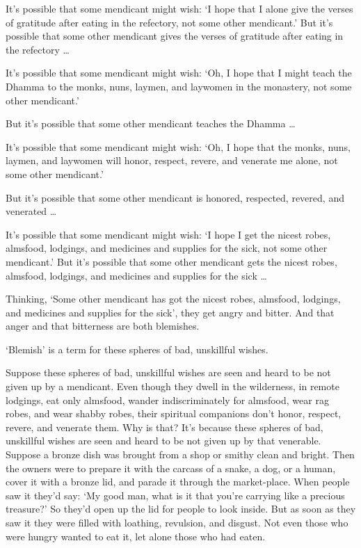 \documentclass[12pt,openany]{book}%
\begin{document}
It’s possible that some mendicant might wish: ‘I hope that I alone give the verses of gratitude after eating in the refectory, not some other mendicant.’ But it’s possible that some other mendicant gives the verses of gratitude after eating in the refectory … 

It’s possible that some mendicant might wish: ‘Oh, I hope that I might teach the Dhamma to the monks, nuns, laymen, and laywomen in the monastery, not some other mendicant.’ 

But it’s possible that some other mendicant teaches the Dhamma … 

It’s possible that some mendicant might wish: ‘Oh, I hope that the monks, nuns, laymen, and laywomen will honor, respect, revere, and venerate me alone, not some other mendicant.’ 

But it’s possible that some other mendicant is honored, respected, revered, and venerated … 

It’s possible that some mendicant might wish: ‘I hope I get the nicest robes, almsfood, lodgings, and medicines and supplies for the sick, not some other mendicant.’ But it’s possible that some other mendicant gets the nicest robes, almsfood, lodgings, and medicines and supplies for the sick … 

Thinking, ‘Some other mendicant has got the nicest robes, almsfood, lodgings, and medicines and supplies for the sick’, they get angry and bitter. And that anger and that bitterness are both blemishes. 

‘Blemish’ is a term for these spheres of bad, unskillful wishes. 

Suppose these spheres of bad, unskillful wishes are seen and heard to be not given up by a mendicant. Even though they dwell in the wilderness, in remote lodgings, eat only almsfood, wander indiscriminately for almsfood, wear rag robes, and wear shabby robes, their spiritual companions don’t honor, respect, revere, and venerate them. Why is that? It’s because these spheres of bad, unskillful wishes are seen and heard to be not given up by that venerable. Suppose a bronze dish was brought from a shop or smithy clean and bright. Then the owners were to prepare it with the carcass of a snake, a dog, or a human, cover it with a bronze lid, and parade it through the market-place. When people saw it they’d say: ‘My good man, what is it that you’re carrying like a precious treasure?’ So they’d open up the lid for people to look inside. But as soon as they saw it they were filled with loathing, revulsion, and disgust. Not even those who were hungry wanted to eat it, let alone those who had eaten. 
\end{document}
